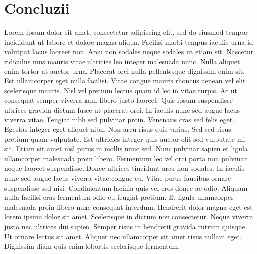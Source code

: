\chapter{Concluzii}

\ifpdf
    \graphicspath{{Chapter3/Figs/Raster/}{Chapter3/Figs/PDF/}{Chapter3/Figs/}}
\else
    \graphicspath{{Chapter3/Figs/Vector/}{Chapter3/Figs/}}
\fi


Lorem ipsum dolor sit amet, consectetur adipiscing elit, sed do eiusmod tempor incididunt ut labore et dolore magna aliqua. Facilisi morbi tempus iaculis urna id volutpat lacus laoreet non. Arcu non sodales neque sodales ut etiam sit. Nascetur ridiculus mus mauris vitae ultricies leo integer malesuada nunc. Nulla aliquet enim tortor at auctor urna. Placerat orci nulla pellentesque dignissim enim sit. Est ullamcorper eget nulla facilisi. Vitae congue mauris rhoncus aenean vel elit scelerisque mauris. Nisl vel pretium lectus quam id leo in vitae turpis. Ac ut consequat semper viverra nam libero justo laoreet. Quis ipsum suspendisse ultrices gravida dictum fusce ut placerat orci. In iaculis nunc sed augue lacus viverra vitae. Feugiat nibh sed pulvinar proin. Venenatis cras sed felis eget. Egestas integer eget aliquet nibh. Non arcu risus quis varius. Sed sed risus pretium quam vulputate.
Est ultricies integer quis auctor elit sed vulputate mi sit. Etiam sit amet nisl purus in mollis nunc sed. Nunc pulvinar sapien et ligula ullamcorper malesuada proin libero. Fermentum leo vel orci porta non pulvinar neque laoreet suspendisse. Donec ultrices tincidunt arcu non sodales. In iaculis nunc sed augue lacus viverra vitae congue eu. Vitae purus faucibus ornare suspendisse sed nisi. Condimentum lacinia quis vel eros donec ac odio. Aliquam nulla facilisi cras fermentum odio eu feugiat pretium. Et ligula ullamcorper malesuada proin libero nunc consequat interdum. Hendrerit dolor magna eget est lorem ipsum dolor sit amet. Scelerisque in dictum non consectetur. Neque viverra justo nec ultrices dui sapien. Semper risus in hendrerit gravida rutrum quisque. Ut ornare lectus sit amet. Aliquet nec ullamcorper sit amet risus nullam eget. Dignissim diam quis enim lobortis scelerisque fermentum.


